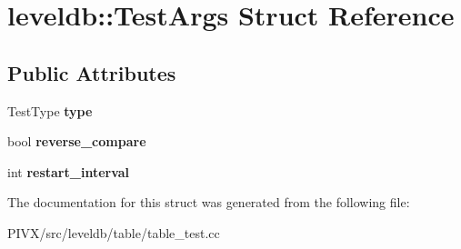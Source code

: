 \hypertarget{structleveldb_1_1_test_args}{}\section{leveldb\+:\+:Test\+Args Struct Reference}
\label{structleveldb_1_1_test_args}
\subsection*{Public Attributes}
\begin{DoxyCompactItemize}
\item 
\mbox{\label{structleveldb_1_1_test_args_a1c2c14e2506bf6c238a2685c38eb16ac}} 
Test\+Type {\bfseries type}
\item 
\mbox{\label{structleveldb_1_1_test_args_ab4c8bef944a4ddf845378f1fce2b6c22}} 
bool {\bfseries reverse\+\_\+compare}
\item 
\mbox{\label{structleveldb_1_1_test_args_a233f5e5e56ff872e26f543585824df1d}} 
int {\bfseries restart\+\_\+interval}
\end{DoxyCompactItemize}


The documentation for this struct was generated from the following file\+:\begin{DoxyCompactItemize}
\item 
P\+I\+V\+X/src/leveldb/table/table\+\_\+test.\+cc\end{DoxyCompactItemize}
